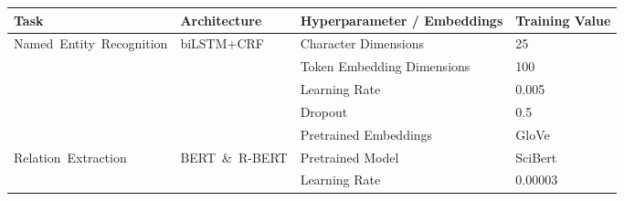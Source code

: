 \begin{tabular}{m{4cm} m{3cm} m{5cm} m{3cm}}
 \toprule
 \textbf{Task} & \textbf{Architecture} & \textbf{Hyperparameter / Embeddings} & \textbf{Training Value} \\
 \hline
    \multirow{4}{*}{\mbox{Named Entity Recognition}} &
    \multirow{4}{*}{\mbox{biLSTM+CRF}} 
        & Character Dimensions & 25 \\
        & & Token Embedding Dimensions & 100 \\
        & & Learning Rate & 0.005 \\
        & & Dropout & 0.5 \\
        & & Pretrained Embeddings & GloVe \cite{pennington2014glove} \\
    \hline
    \multirow{2}{*}{\mbox{Relation Extraction}} &
    \multirow{2}{*}{\mbox{BERT \& R-BERT}} 
        & Pretrained Model & SciBert  \\
        & & Learning Rate & 0.00003 \\
 \hline
\end{tabular}
